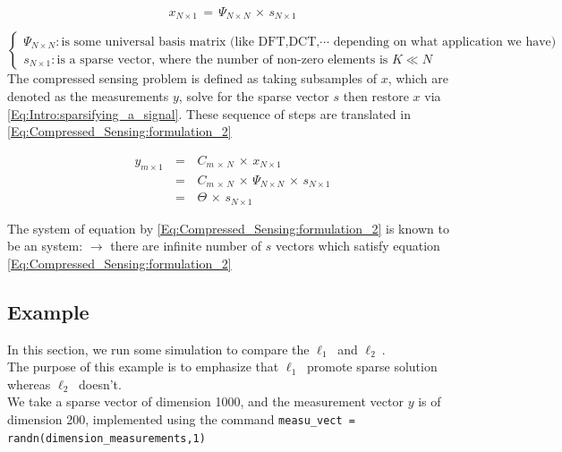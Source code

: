 \documentclass[12pt,a4paper]{book}
\begin{document}
\begin{equation}
x_{N \times 1} \, = \, \Psi_{N \times N} \, \times \, s_{N \times 1}
\label{Eq:Intro:sparsifying_a_signal}
\end{equation}

$\begin{cases}
\Psi_{N \times N}: \text{is some universal basis matrix (like DFT,DCT,$\cdots$ depending on what application we have)} \\
s_{N \times 1}: \text{is a sparse vector, where the number of non-zero elements is } K \ll N
\end{cases}$\\


The compressed sensing problem is defined as taking subsamples of $x$, which are denoted as the measurements $y$, solve for the sparse vector $s$ then restore $x$ via \autoref{Eq:Intro:sparsifying_a_signal}. These sequence of steps are translated in \autoref{Eq:Compressed_Sensing:formulation_2}

\begin{equation}
	\begin{array}{rcl}
	y_{m \times 1} \, &=& \, C_{m \, \times \, N} \,\times \,  x_{N \times 1} \\ 
		 &=& \, C_{m \, \times \, N} \, \times \, \Psi_{N \times N} \, \times \, s_{N \times 1} \\
		 &=& \, \Theta \, \times \, s_{N \times 1}
	\end{array}
\label{Eq:Compressed_Sensing:formulation_2}
\end{equation}

The system of equation by \autoref{Eq:Compressed_Sensing:formulation_2} is known to be an  system: $\rightarrow$ there are infinite number of $s$ vectors which satisfy equation \autoref{Eq:Compressed_Sensing:formulation_2}


\newpage
\subsection{Example}

In this section, we run some simulation to compare the $\ell_1 ~$ and $\ell_2 ~$.\\

The purpose of this example is to emphasize that $\ell_1 ~$ promote sparse solution whereas $\ell_2 ~$ doesn't.\\

We take a sparse vector of dimension 1000, and the measurement vector $y$ is of dimension 200, implemented using the command \verb|measu_vect = randn(dimension_measurements,1)|\\
\end{document}
